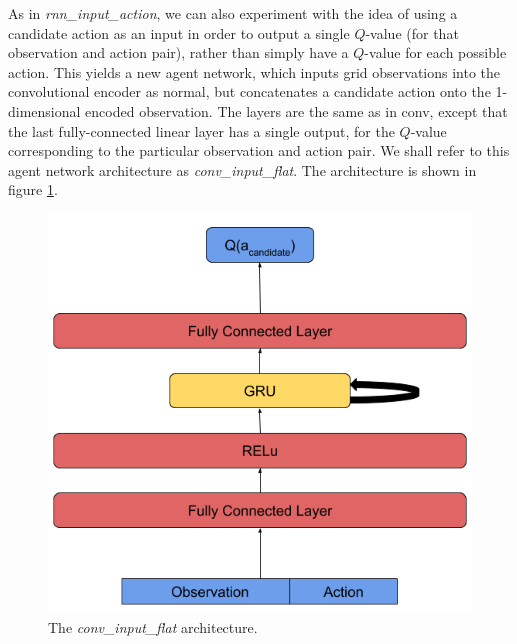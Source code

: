 As in \textit{rnn\_input\_action}, we can also experiment with the idea of using a candidate action as an input in order to output a single $Q$-value (for that observation and action pair), rather than simply have a $Q$-value for each possible action. This yields a new agent network, which inputs grid observations into the convolutional encoder as normal, but concatenates a candidate action onto the 1-dimensional encoded observation. The layers are the same as in conv, except that the last fully-connected linear layer has a single output, for the $Q$-value corresponding to the particular observation and action pair. We shall refer to this agent network architecture as \textit{conv\_input\_flat}. The architecture is shown in figure \ref{fig:conv_input_flat_diagram}.

\begin{figure}
    \centering
    \includegraphics[scale=0.3]{images/agent_diagrams/rnn_input_action_agent_diagram.png}
    \caption{The \textit{conv\_input\_flat} architecture.}
    \label{fig:conv_input_flat_diagram}
\end{figure}


